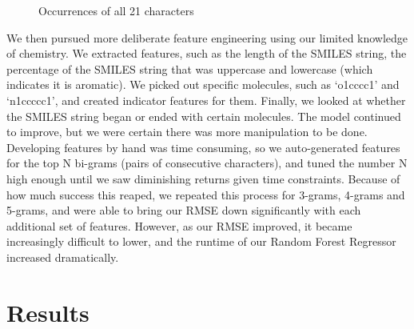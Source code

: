 \documentclass[]{article}
\begin{document}
\begin{flushleft}
\begin{figure}[h]
		\caption{Occurrences of all 21 characters}
	\end{figure}
	\newline\newline
	We then pursued more deliberate feature engineering using our limited knowledge of chemistry. We extracted features, such as the length of the SMILES string, the percentage of the SMILES string that was uppercase and lowercase (which indicates it is aromatic). We picked out specific molecules, such as ‘o1cccc1’ and ‘n1ccccc1’, and created indicator features for them.  Finally, we looked at whether the SMILES string began or ended with certain molecules. 
	\newline\newline
	The model continued to improve, but we were certain there was more manipulation to be done. Developing features by hand was time consuming, so we auto-generated features for the top N bi-grams (pairs of consecutive characters), and tuned the number N high enough until we saw diminishing returns given time constraints. Because of how much success this reaped, we repeated this process for 3-grams, 4-grams and 5-grams, and were able to bring our RMSE down significantly with each additional set of features.  However, as our RMSE improved, it became increasingly difficult to lower, and the runtime of our Random Forest Regressor increased dramatically.
	\newline\newline
\end{flushleft}
\section{Results}
\end{document}
